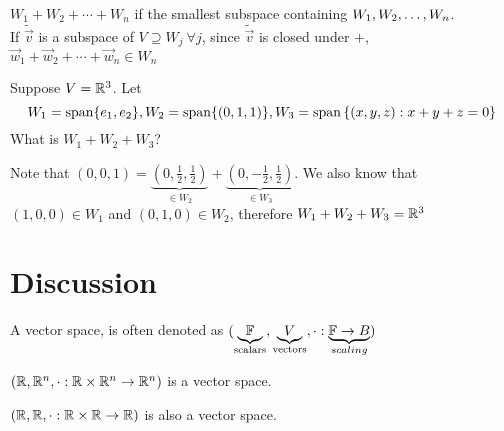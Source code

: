 \begin{remark}
    $W_1 + W_2 + \cdots + W_n$ if the smallest subspace containing ${W}_1,{W}_2, \ldots, {W}_{n}$. \\
    If $\tilde {\vec v}$ is a subspace of $V \supseteq W_j \ \forall j$, since $\tilde {\vec v}$ is closed under $+$, $\vec w_1 + \vec w_2 + \cdots + \vec w_n \in W_n$
\end{remark}
\begin{example}
Suppose $V = \mathbb R^3$. Let \[W_1 = \text{span} \{e_1, e_2\}, W_2 = \text{span} \{(0,1,1)\}, W_3 = \text{span} \left\{ (x,y,z) : x + y + z = 0 \right\}\] 
What is $W_1 + W_2 + W_3$?
\end{example}
Note that $(0,0,1) = \underbrace{\left(0,\frac12,\frac12\right)}_{\in W_2} +  \underbrace{\left(0,-\frac12,\frac12\right)}_{\in W_3}$. We also know that $(1,0,0) \in W_1$ and $(0,1,0) \in W_2$, therefore $W_1 + W_2 + W_3 = \mathbb R^3$ \\
\section*{Discussion}
\begin{definition}
    A vector space, is often denoted as $(\underbrace{\mathbb F}_{\text{scalars}}, \underbrace{V}_{\text{vectors}}, \cdot : \underbrace{\mathbb F \to B}_{scaling})$
\end{definition}
\begin{example}
    $(\mathbb R,\mathbb R^n, \cdot : \mathbb R \times \mathbb R^n \to \mathbb R^n)$ is a vector space.
\end{example}
\begin{example}
    $(\mathbb R, \mathbb R, \cdot : \mathbb R \times \mathbb R \to \mathbb R)$ is also a vector space.
\end{example}
